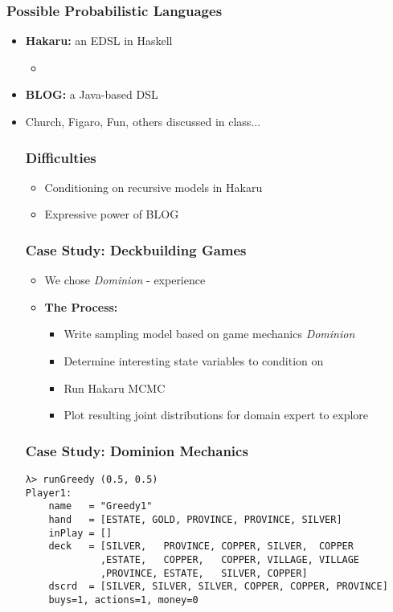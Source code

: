 \begin{frame} \frametitle{Possible Probabilistic Languages}
\begin{itemize}
\item {\bf Hakaru:} an EDSL in Haskell
  \begin{itemize}
  \item 
  \end{itemize}
\item {\bf BLOG:} a Java-based DSL
  \begin{itemize}
  \end{itemize}
\item Church, Figaro, Fun, others discussed in class...

\begin{frame} \frametitle{Difficulties}
\begin{itemize}
\item Conditioning on recursive models in Hakaru
\item Expressive power of BLOG
\end{itemize}

\begin{frame} \frametitle{Case Study: Deckbuilding Games}
\begin{itemize}
\item We chose \emph{Dominion} - experience
\item {\bf The Process:}
  \begin{itemize}
  \item Write sampling model based on game mechanics \emph{Dominion}
  \item Determine interesting state variables to condition on
  \item Run Hakaru MCMC
  \item Plot resulting joint distributions for domain expert to explore
  \end{itemize}
\end{itemize}
\end{frame}

\begin{frame} \frametitle{Case Study: Dominion Mechanics}
\begin{verbatim}
λ> runGreedy (0.5, 0.5)
Player1:
    name   = "Greedy1"
    hand   = [ESTATE, GOLD, PROVINCE, PROVINCE, SILVER]
    inPlay = []
    deck   = [SILVER,   PROVINCE, COPPER, SILVER,  COPPER
             ,ESTATE,   COPPER,   COPPER, VILLAGE, VILLAGE
             ,PROVINCE, ESTATE,   SILVER, COPPER]
    dscrd  = [SILVER, SILVER, SILVER, COPPER, COPPER, PROVINCE]
    buys=1, actions=1, money=0


\end{verbatim}
\end{frame}
\end{frame}
\end{itemize}
\end{frame}
